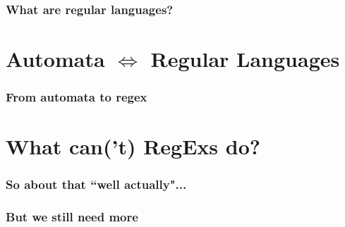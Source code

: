 \documentclass{beamer}
\begin{document}
\begin{frame}
	\frametitle{What are regular languages?}
\end{frame}





\section*{Automata $\iff$ Regular Languages}
\begin{frame}
	\frametitle{From automata to regex}
\end{frame}


\section*{What can('t) RegExs do?}

\begin{frame}
	\frametitle{So about that ``well actually"...}
\end{frame}

\begin{frame}
	\frametitle{But we still need more}
\end{frame}

\end{document}
